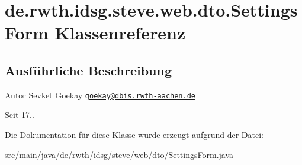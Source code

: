 \hypertarget{classde_1_1rwth_1_1idsg_1_1steve_1_1web_1_1dto_1_1_settings_form}{\section{de.\-rwth.\-idsg.\-steve.\-web.\-dto.\-Settings\-Form Klassenreferenz}
\label{classde_1_1rwth_1_1idsg_1_1steve_1_1web_1_1dto_1_1_settings_form}
}


\subsection{Ausführliche Beschreibung}
\begin{DoxyAuthor}{Autor}
Sevket Goekay \href{mailto:goekay@dbis.rwth-aachen.de}{\tt goekay@dbis.\-rwth-\/aachen.\-de} 
\end{DoxyAuthor}
\begin{DoxySince}{Seit}
17.. 
\end{DoxySince}


Die Dokumentation für diese Klasse wurde erzeugt aufgrund der Datei\-:\begin{DoxyCompactItemize}
\item 
src/main/java/de/rwth/idsg/steve/web/dto/\hyperlink{_settings_form_8java}{Settings\-Form.\-java}\end{DoxyCompactItemize}

